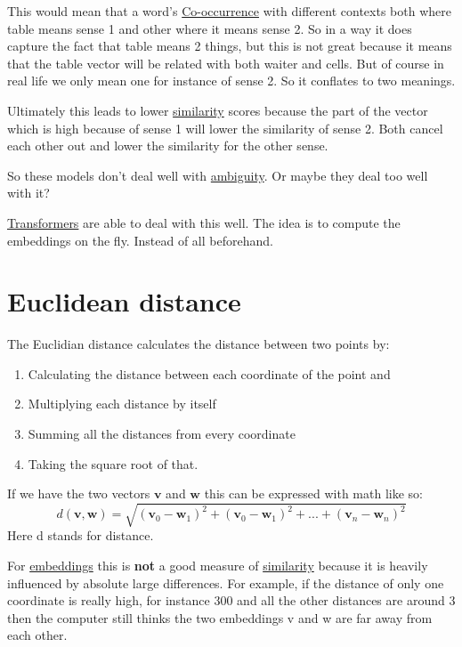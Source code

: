 \documentclass[
  11pt,
  british,
]{article}
\providecommand{\tightlist}{%
  \setlength{\itemsep}{0pt}\setlength{\parskip}{0pt}}
\begin{document}
This would mean that a word's \href{Co-occurrence.md}{Co-occurrence}
with different contexts both where table means sense 1 and other where
it means sense 2. So in a way it does capture the fact that table means
2 things, but this is not great because it means that the table vector
will be related with both waiter and cells. But of course in real life
we only mean one for instance of sense 2. So it conflates to two
meanings.

Ultimately this leads to lower \href{Similarity.md}{similarity} scores
because the part of the vector which is high because of sense 1 will
lower the similarity of sense 2. Both cancel each other out and lower
the similarity for the other sense.

So these models don't deal well with
\href{../Languages/Ambiguity.md}{ambiguity}. Or maybe they deal too well
with it?

\href{../Prediction/Transformers.md}{Transformers} are able to deal with
this well. The idea is to compute the embeddings on the fly. Instead of
all beforehand.

\hypertarget{euclidean-distance}{%
\section{Euclidean distance}\label{euclidean-distance}}

The Euclidian distance calculates the distance between two points by:

\begin{enumerate}
\def\labelenumi{\arabic{enumi}.}
\tightlist
\item
  Calculating the distance between each coordinate of the point and
\item
  Multiplying each distance by itself
\item
  Summing all the distances from every coordinate
\item
  Taking the square root of that.
\end{enumerate}

If we have the two vectors \(\textbf{v}\) and \(\textbf{w}\) this can be
expressed with math like so:
\[d(\textbf{v}, \textbf{w}) = \sqrt{(\textbf{v}_{0}-\textbf{w}_{1})^2+(\textbf{v}_{0}-\textbf{w}_{1})^2+...+(\textbf{v}_{n}-\textbf{w}_{n})^2}\]
Here d stands for distance.

For \href{Embeddings.md}{embeddings} this is \textbf{not} a good measure
of \href{Similarity.md}{similarity} because it is heavily influenced by
absolute large differences. For example, if the distance of only one
coordinate is really high, for instance 300 and all the other distances
are around 3 then the computer still thinks the two embeddings v and w
are far away from each other.
\end{document}
